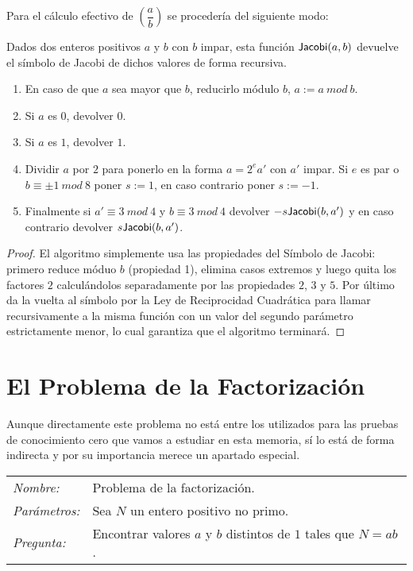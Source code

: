 Para el c\'alculo efectivo de $\left( \dfrac{a}{b} \right)$ se proceder\'ia del siguiente modo:

\begin{algorithm}
\label{algoSimJacob}
Dados dos enteros positivos $a$ y $b$ con $b$ impar, esta funci\'on ${\sf Jacobi}(a,b)$ devuelve
el s\'imbolo de Jacobi de dichos valores de forma recursiva.
\begin{enumerate}
\item En caso de que $a$ sea mayor que $b$, reducirlo m\'odulo $b$, $a := a ~ mod ~b$.
\item Si $a$ es $0$, devolver $0$.
\item Si $a$ es $1$, devolver $1$.
\item Dividir $a$ por $2$ para ponerlo en la forma $a = 2^e a'$ con $a'$ impar. Si $e$ es par o $b \equiv \pm 1 ~mod~8$ poner $s := 1$, en caso contrario poner $s := -1$.
\item Finalmente si $a' \equiv 3 ~mod~4$ y $b \equiv 3~mod~4$ devolver $-s {\sf Jacobi}(b,a')$ y en caso contrario devolver $s {\sf Jacobi}(b,a')$.
\end{enumerate}
\end{algorithm}
\begin{proof}
El algoritmo simplemente usa las propiedades del S\'imbolo de Jacobi: primero
reduce m\'oduo $b$ (propiedad 1), elimina casos extremos y
luego quita los factores $2$ calcul\'andolos
separadamente por las propiedades $2$, $3$ y $5$.
Por \'ultimo da la vuelta al s\'imbolo por la Ley de Reciprocidad Cuadr\'atica
para llamar recursivamente a la misma funci\'on con un valor del segundo
par\'ametro estrictamente menor, lo cual garantiza que el algoritmo terminar\'a.
\end{proof}

\section{El Problema de la Factorizaci\'on}

Aunque directamente este problema no est\'a entre los utilizados para las pruebas
de conocimiento cero que vamos a estudiar en esta memoria, s\'i lo est\'a de forma
indirecta y por su importancia merece un apartado especial.

\hfil

\begin{tabular}{|ll}
	\textit{Nombre:} & Problema de la factorizaci\'on. \\
	\textit{Parámetros:} & Sea $N$ un entero positivo no primo. \\
	\textit{Pregunta:} & Encontrar valores $a$ y $b$ distintos de $1$ tales que $N = ab$. \\
\end{tabular}
\\

